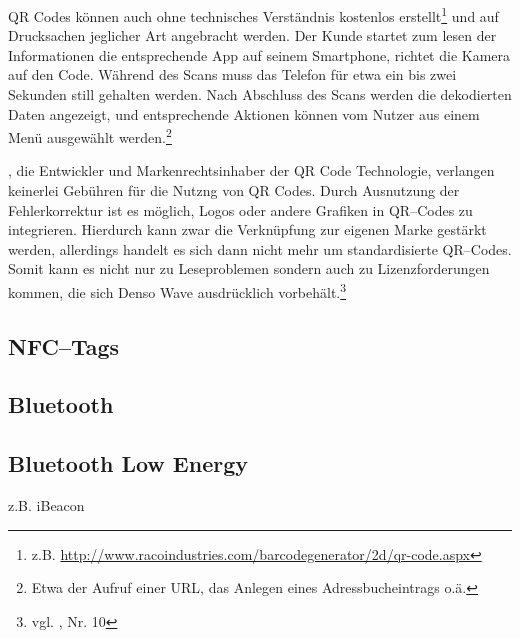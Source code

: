 QR Codes können auch ohne technisches Verständnis kostenlos erstellt\footnote{z.B. \url{http://www.racoindustries.com/barcodegenerator/2d/qr-code.aspx}} und auf Drucksachen jeglicher Art angebracht werden. Der Kunde startet zum lesen der Informationen die entsprechende App auf seinem Smartphone, richtet die Kamera auf den Code. Während des Scans muss das Telefon für etwa ein bis zwei Sekunden still gehalten werden. Nach Abschluss des Scans werden die dekodierten Daten angezeigt, und entsprechende Aktionen können vom Nutzer aus einem Menü ausgewählt werden.\footnote{Etwa der Aufruf einer URL, das Anlegen eines Adressbucheintrags o.ä.} 

, die Entwickler und Markenrechtsinhaber der QR Code Technologie,  verlangen keinerlei Gebühren für die Nutzng von QR Codes. Durch Ausnutzung der Fehlerkorrektur ist es möglich, Logos oder andere Grafiken in QR–Codes zu integrieren. Hierdurch kann zwar die Verknüpfung zur eigenen Marke gestärkt werden, allerdings handelt es sich dann nicht mehr um standardisierte QR–Codes. Somit kann es nicht nur zu Leseproblemen sondern auch zu Lizenzforderungen kommen, die sich Denso Wave ausdrücklich vorbehält.\footnote{vgl. \cite{denso-faq}, Nr. 10}

\subsection{NFC–Tags} %
\label{sub:nfc_tags}

\subsection{Bluetooth} %
\label{sub:bluetooth}


\subsection{Bluetooth Low Energy} %
\label{sub:bluetooth_low_energy}
z.B. iBeacon

